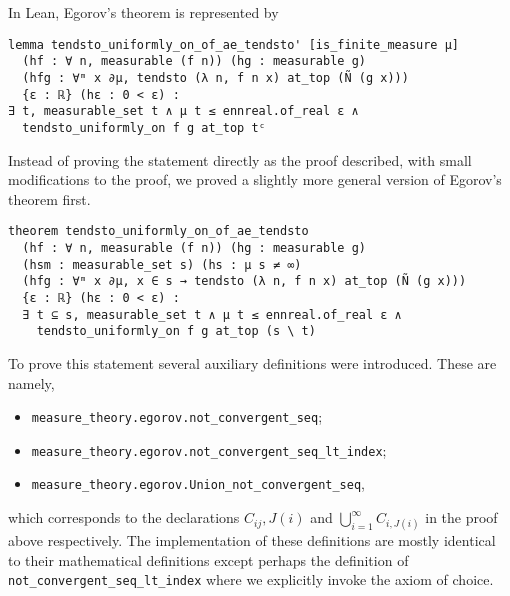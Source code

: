 \documentclass[]{article}
\theoremstyle{definition}
\begin{document}
In Lean, Egorov's theorem is represented by 
\begin{verbatim}
lemma tendsto_uniformly_on_of_ae_tendsto' [is_finite_measure μ]
  (hf : ∀ n, measurable (f n)) (hg : measurable g)
  (hfg : ∀ᵐ x ∂μ, tendsto (λ n, f n x) at_top (Ñ (g x)))
  {ε : ℝ} (hε : 0 < ε) :
∃ t, measurable_set t ∧ μ t ≤ ennreal.of_real ε ∧
  tendsto_uniformly_on f g at_top tᶜ
\end{verbatim}

Instead of proving the statement directly as the proof described, with small modifications 
to the proof, we proved a slightly more general version of Egorov's theorem first.
\begin{verbatim}
theorem tendsto_uniformly_on_of_ae_tendsto
  (hf : ∀ n, measurable (f n)) (hg : measurable g) 
  (hsm : measurable_set s) (hs : μ s ≠ ∞)
  (hfg : ∀ᵐ x ∂μ, x ∈ s → tendsto (λ n, f n x) at_top (Ñ (g x))) 
  {ε : ℝ} (hε : 0 < ε) :
  ∃ t ⊆ s, measurable_set t ∧ μ t ≤ ennreal.of_real ε ∧ 
    tendsto_uniformly_on f g at_top (s \ t)
\end{verbatim}
To prove this statement several auxiliary definitions were introduced. These are 
namely,
\begin{itemize}
  \item \texttt{measure_theory.egorov.not_convergent_seq};
  \item \texttt{measure_theory.egorov.not_convergent_seq_lt_index};
  \item \texttt{measure_theory.egorov.Union_not_convergent_seq},
\end{itemize}
which corresponds to the declarations \(C_{ij}, J(i)\) and \(\bigcup_{i = 1}^\infty C_{i, J(i)}\) 
in the proof above respectively. The implementation of these definitions are mostly
identical to their mathematical definitions except perhaps the definition of 
\texttt{not_convergent_seq_lt_index} where we explicitly invoke 
the axiom of choice. 
\end{document}
